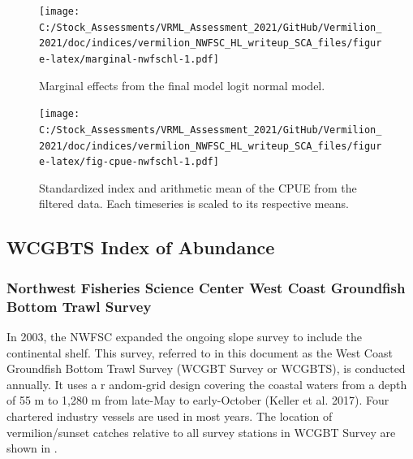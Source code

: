 \documentclass[11pt,
  english,
  a4paper,
]{article}
\begin{document}
\begin{figure}
\centering
\texttt{[image: C:/Stock\_Assessments/VRML\_Assessment\_2021/GitHub/Vermilion\_2021/doc/indices/vermilion\_NWFSC\_HL\_writeup\_SCA\_files/figure-latex/marginal-nwfschl-1.pdf]}
\caption{\label{fig:marginal-nwfschl}Marginal effects from the final model logit normal model.}
\end{figure}

\begin{figure}
\centering
\texttt{[image: C:/Stock\_Assessments/VRML\_Assessment\_2021/GitHub/Vermilion\_2021/doc/indices/vermilion\_NWFSC\_HL\_writeup\_SCA\_files/figure-latex/fig-cpue-nwfschl-1.pdf]}
\caption{\label{fig:fig-cpue-nwfschl}Standardized index and arithmetic mean of the CPUE from the filtered data. Each timeseries is scaled to its respective means.}
\end{figure}

\clearpage


\hypertarget{wcgbts-index}{%
\subsection{WCGBTS Index of Abundance}\label{wcgbts-index}}

\leavevmode\tagmcend\tagstructend


\hypertarget{northwest-fisheries-science-center-west-coast-groundfish-bottom-trawl-survey}{%
\subsubsection{Northwest Fisheries Science Center West Coast Groundfish Bottom Trawl Survey}\label{northwest-fisheries-science-center-west-coast-groundfish-bottom-trawl-survey}}

\leavevmode\tagmcend\tagstructend

In 2003, the NWFSC expanded the ongoing slope survey to include the continental shelf. This survey, referred to in this document as the West Coast Groundfish Bottom Trawl Survey (WCGBT Survey or WCGBTS), is conducted annually. It uses a r andom-grid design covering the coastal waters from a depth of 55 m to 1,280 m from late-May to early-October {(Keller et al. 2017)\leavevmode\tagmcend\tagstructend}. Four chartered industry vessels are used in most years. The location of vermilion/sunset catches relative to all survey stations in WCGBT Survey are shown in .
\end{document}
